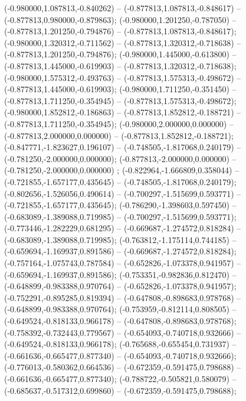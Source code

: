  (-0.980000,1.087813,-0.840262) -- (-0.877813,1.087813,-0.848617) -- (-0.877813,0.980000,-0.879863);
 (-0.980000,1.201250,-0.787050) -- (-0.877813,1.201250,-0.794876) -- (-0.877813,1.087813,-0.848617);
 (-0.980000,1.320312,-0.711562) -- (-0.877813,1.320312,-0.718638) -- (-0.877813,1.201250,-0.794876);
 (-0.980000,1.445000,-0.613800) -- (-0.877813,1.445000,-0.619903) -- (-0.877813,1.320312,-0.718638);
 (-0.980000,1.575312,-0.493763) -- (-0.877813,1.575313,-0.498672) -- (-0.877813,1.445000,-0.619903);
 (-0.980000,1.711250,-0.351450) -- (-0.877813,1.711250,-0.354945) -- (-0.877813,1.575313,-0.498672);
 (-0.980000,1.852812,-0.186863) -- (-0.877813,1.852812,-0.188721) -- (-0.877813,1.711250,-0.354945);
 (-0.980000,2.000000,0.000000) -- (-0.877813,2.000000,0.000000) -- (-0.877813,1.852812,-0.188721);
 (-0.847771,-1.823627,0.196107) -- (-0.748505,-1.817068,0.240179) -- (-0.781250,-2.000000,0.000000);
 (-0.877813,-2.000000,0.000000) -- (-0.781250,-2.000000,0.000000) ;
 (-0.822964,-1.666809,0.358044) -- (-0.721855,-1.657177,0.435645) -- (-0.748505,-1.817068,0.240179);
 (-0.802656,-1.526056,0.490614) -- (-0.700297,-1.515699,0.593771) -- (-0.721855,-1.657177,0.435645);
 (-0.786290,-1.398603,0.597450) -- (-0.683089,-1.389088,0.719985) -- (-0.700297,-1.515699,0.593771);
 (-0.773446,-1.282229,0.681295) -- (-0.669687,-1.274572,0.818284) -- (-0.683089,-1.389088,0.719985);
 (-0.763812,-1.175114,0.744185) -- (-0.659694,-1.169937,0.891586) -- (-0.669687,-1.274572,0.818284);
 (-0.757164,-1.075743,0.787584) -- (-0.652826,-1.073378,0.941957) -- (-0.659694,-1.169937,0.891586);
 (-0.753351,-0.982836,0.812470) -- (-0.648899,-0.983388,0.970764) -- (-0.652826,-1.073378,0.941957);
 (-0.752291,-0.895285,0.819394) -- (-0.647808,-0.898683,0.978768) -- (-0.648899,-0.983388,0.970764);
 (-0.753959,-0.812114,0.808505) -- (-0.649524,-0.818133,0.966178) -- (-0.647808,-0.898683,0.978768);
 (-0.758392,-0.732443,0.779567) -- (-0.654093,-0.740718,0.932666) -- (-0.649524,-0.818133,0.966178);
 (-0.765688,-0.655454,0.731937) -- (-0.661636,-0.665477,0.877340) -- (-0.654093,-0.740718,0.932666);
 (-0.776013,-0.580362,0.664536) -- (-0.672359,-0.591475,0.798688) -- (-0.661636,-0.665477,0.877340);
 (-0.788722,-0.505821,0.580079) -- (-0.685637,-0.517312,0.699860) -- (-0.672359,-0.591475,0.798688);
